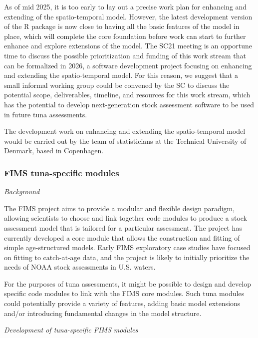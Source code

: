 \documentclass{SCreport}
\begin{document}
As of mid 2025, it is too early to lay out a precise work plan for enhancing and
extending of the spatio-temporal model. However, the latest development version
of the R package is now close to having all the basic features of the model in
place, which will complete the core foundation before work can start to further
enhance and explore extensions of the model. The SC21 meeting is an opportune
time to discuss the possible prioritization and funding of this work stream that
can be formalized in 2026, a software development project focusing on enhancing
and extending the spatio-temporal model. For this reason, we suggest that a
small informal working group could be convened by the SC to discuss the
potential scope, deliverables, timeline, and resources for this work stream,
which has the potential to develop next-generation stock assessment software to
be used in future tuna assessments.

The development work on enhancing and extending the spatio-temporal model would
be carried out by the team of statisticians at the Technical University of
Denmark, based in Copenhagen.

\vspace{2ex}

\subsubsection{FIMS tuna-specific modules}
\label{sec:fims-development-project}

\textit{Background}

The FIMS project aims to provide a modular and flexible design paradigm,
allowing scientists to choose and link together code modules to produce a stock
assessment model that is tailored for a particular assessment. The project has
currently developed a core module that allows the construction and fitting of
simple age-structured models. Early FIMS exploratory case studies have focused
on fitting to catch-at-age data, and the project is likely to initially
prioritize the needs of NOAA stock assessments in U.S. waters.

For the purposes of tuna assessments, it might be possible to design and develop
specific code modules to link with the FIMS core modules. Such tuna modules
could potentially provide a variety of features, adding basic model extensions
and/or introducing fundamental changes in the model structure.

\newpage

\textit{Development of tuna-specific FIMS modules}
\end{document}
